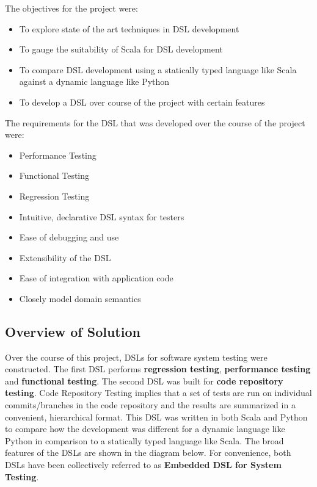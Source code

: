 \noindent
The objectives for the project were:
\begin{itemize}
\item To explore state of the art techniques in DSL development
\item To gauge the suitability of Scala for DSL development
\item To compare DSL development using a statically typed language like Scala against a dynamic language like Python
\item To develop a DSL over course of the project with certain features
\end{itemize}

\noindent
The requirements for the DSL that was developed over the course of the project were:
\begin{itemize}
\item Performance Testing
\item Functional Testing
\item Regression Testing
\item Intuitive, declarative DSL syntax for testers
\item Ease of debugging and use
\item Extensibility of the DSL
\item Ease of integration with application code
\item Closely model domain semantics
\end{itemize}

\subsection{Overview of Solution}

Over the course of this project, DSLs for software system testing were constructed. The first DSL performs \textbf{regression testing}, \textbf{performance testing} and \textbf{functional testing}. The second DSL was built for \textbf{code repository testing}. Code Repository Testing implies that a set of tests are run on individual commits/branches in the code repository and the results are summarized in a convenient, hierarchical format. This DSL was written in both Scala and Python to compare how the development was different for a dynamic language like Python in comparison to a statically typed language like Scala. The broad features of the DSLs are shown in the diagram below. For convenience, both DSLs have been collectively referred to as \textbf{Embedded DSL for System Testing}.

